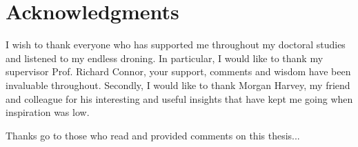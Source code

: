
\begingroup
\let\clearpage\relax
\let\cleardoublepage\relax
\let\cleardoublepage\relax
\chapter*{Acknowledgments}
I wish to thank everyone who has supported me throughout my doctoral studies and listened to my endless droning.  In particular, I would like to thank my supervisor Prof. Richard Connor, your support, comments and wisdom have been invaluable throughout.  Secondly, I would like to thank Morgan Harvey, my friend and colleague for his interesting and useful insights that have kept me going when inspiration was low.  

Thanks go to those who read and provided comments on this thesis...  




\endgroup




